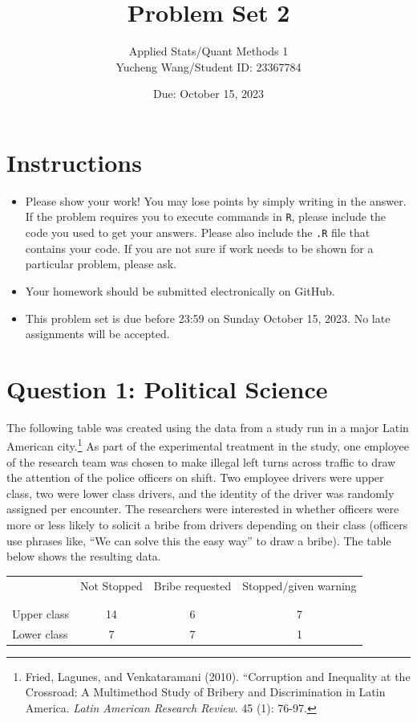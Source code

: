 \documentclass[12pt,letterpaper]{article}
\title{Problem Set 2}
\date{Due: October 15, 2023}
\author{Applied Stats/Quant Methods 1\\
Yucheng Wang/Student ID: 23367784}
\begin{document}
	\maketitle
	\section*{Instructions}
\begin{itemize}
	\item Please show your work! You may lose points by simply writing in the answer. If the problem requires you to execute commands in \texttt{R}, please include the code you used to get your answers. Please also include the \texttt{.R} file that contains your code. If you are not sure if work needs to be shown for a particular problem, please ask.
	\item Your homework should be submitted electronically on GitHub.
	\item This problem set is due before 23:59 on Sunday October 15, 2023. No late assignments will be accepted.

\end{itemize}

	
	\vspace{.5cm}
	\section*{Question 1: Political Science}
		\vspace{.25cm}
	The following table was created using the data from a study run in a major Latin American city.\footnote{Fried, Lagunes, and Venkataramani (2010). ``Corruption and Inequality at the Crossroad: A Multimethod Study of Bribery and Discrimination in Latin America. \textit{Latin American Research Review}. 45 (1): 76-97.} As part of the experimental treatment in the study, one employee of the research team was chosen to make illegal left turns across traffic to draw the attention of the police officers on shift. Two employee drivers were upper class, two were lower class drivers, and the identity of the driver was randomly assigned per encounter. The researchers were interested in whether officers were more or less likely to solicit a bribe from drivers depending on their class (officers use phrases like, ``We can solve this the easy way'' to draw a bribe). The table below shows the resulting data.

\newpage
\begin{table}[h!]
	\centering
	\begin{tabular}{l | c c c }
		& Not Stopped & Bribe requested & Stopped/given warning \\
		\\[-1.8ex] 
		\hline \\[-1.8ex]
		Upper class & 14 & 6 & 7 \\
		Lower class & 7 & 7 & 1 \\
		\hline
	\end{tabular}
\end{table}
\end{document}
